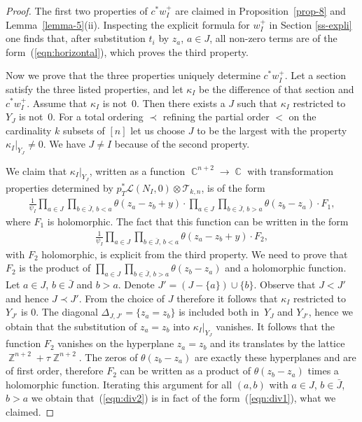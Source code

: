 \documentclass[10pt,a4paper]{amsart}
\numberwithin{equation}{section}
\DeclareMathOperator\C{\mathbb C}
\DeclareMathOperator\Z{\mathbb Z}
\begin{document}
\begin{proof}The first two properties of $c ^*w^+_I$ are claimed in Proposition~\ref{prop-8} and Lem\-ma~\ref{lemma-5}(ii). Inspecting the explicit formula for $w^+_I$ in Section \ref{ss-expli} one finds that, after substitution $t_i$ by $z_a$, $a\in J$, all non-zero terms are of the form~(\ref{eqn:horizontal}), which proves the third property.

Now we prove that the three properties uniquely determine $c ^*w_I^+$. Let a section satisfy the three listed properties, and let $\kappa_I$ be the difference of that section and $c ^*w_I^+$.
Assume that $\kappa_I$ is not~0. Then there exists a $J$ such that $\kappa_I$ restricted to~$Y_J$ is not~0. For a total ordering $\prec$ refining the partial order $<$ on the cardinality $k$ subsets of $[n]$ let us choose $J$ to be the largest with the property $\kappa_I|_{Y_J}\not=0$. We have $J\not=I$ because of the second property.

We claim that $\kappa_I|_{Y_J}$, written as a function $\C^{n+2}\to \C$ with transformation properties determined by $p_T^*\mathcal L(N_I,0)\otimes \mathcal T_{k,n}$, is of the form
\begin{gather}\label{eqn:div1}
\frac{1}{\psi_I} \prod_{a\in J} \prod_{b\in \bar J,\, b<a} \theta(z_a-z_b+y) \cdot \prod_{a\in J} \prod_{b\in \bar J,\,b>a} \theta(z_b-z_a)\cdot F_1,
\end{gather}
where $F_1$ is holomorphic. The fact that this function can be written in the form
\begin{gather}\label{eqn:div2}
\frac{1}{\psi_I} \prod_{a\in J}\prod_{b\in\bar J,\,b<a} \theta(z_a-z_b+y) \cdot F_2,
\end{gather}
with $F_2$ holomorphic, is explicit from the third property. We need to prove that $F_2$ is the product of $\prod\limits_{a\in J}\prod\limits_{b\in\bar J,\, b>a} \theta(z_b-z_a)$ and a holomorphic function. Let $a\in J$, $b\in \bar{J}$ and $b>a$. Denote $J'=(J-\{a\})\cup \{b\}$. Observe that $J<J'$ and hence $J\prec J'$. From the choice of $J$ therefore it follows that $\kappa_I$ restricted to $Y_{J'}$ is 0. The diagonal $\Delta_{J,J'}=\{z_a=z_b\}$ is included both in~$Y_J$ and $Y_{J'}$, hence we obtain that the substitution of $z_a=z_b$ into $\kappa_I|_{Y_J}$ vanishes. It follows that the function $F_2$ vanishes on the hyperplane $z_a=z_b$ and its translates by the lattice $\Z^{n+2}+\tau\Z^{n+2}$. The zeros of $\theta(z_b-z_a)$ are exactly these hyperplanes and are of first order, therefore $F_2$ can be written as a product of $\theta(z_b-z_a)$ times a holomorphic function. Iterating this argument for all $(a,b)$ with $a\in J$, $b\in \bar{J}$, $b>a$ we obtain that~(\ref{eqn:div2}) is in fact of the form~(\ref{eqn:div1}), what we claimed.


\end{proof}
\end{document}

